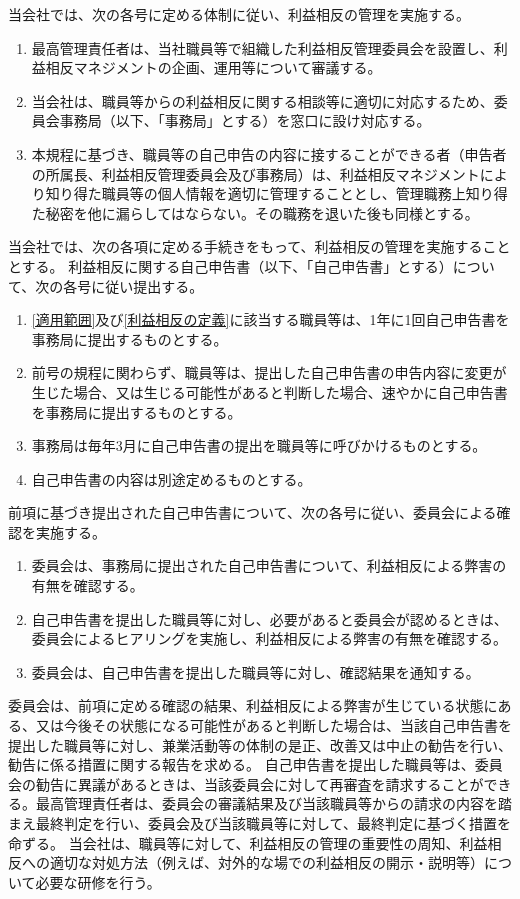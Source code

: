 \documentclass[10pt,a4paper,uplatex]{jsarticle}
\begin{document}
当会社では、次の各号に定める体制に従い、利益相反の管理を実施する。
\begin{enumerate}
	\item 最高管理責任者は、当社職員等で組織した利益相反管理委員会を設置し、利益相反マネジメントの企画、運用等について審議する。
	\item 当会社は、職員等からの利益相反に関する相談等に適切に対応するため、委員会事務局（以下、「事務局」とする）を窓口に設け対応する。
	\item 本規程に基づき、職員等の自己申告の内容に接することができる者（申告者の所属長、利益相反管理委員会及び事務局）は、利益相反マネジメントにより知り得た職員等の個人情報を適切に管理することとし、管理職務上知り得た秘密を他に漏らしてはならない。その職務を退いた後も同様とする。
\end{enumerate}

当会社では、次の各項に定める手続きをもって、利益相反の管理を実施することとする。
\term 利益相反に関する自己申告書（以下、「自己申告書」とする）について、次の各号に従い提出する。
\begin{enumerate}
	 \item \ref{適用範囲}及び\ref{利益相反の定義}に該当する職員等は、1年に1回自己申告書を事務局に提出するものとする。
	 \item  前号の規程に関わらず、職員等は、提出した自己申告書の申告内容に変更が生じた場合、又は生じる可能性があると判断した場合、速やかに自己申告書を事務局に提出するものとする。
	 \item 事務局は毎年3月に自己申告書の提出を職員等に呼びかけるものとする。
	 \item 自己申告書の内容は別途定めるものとする。
\end{enumerate}

\term 前項に基づき提出された自己申告書について、次の各号に従い、委員会による確認を実施する。
\begin{enumerate}
	\item 委員会は、事務局に提出された自己申告書について、利益相反による弊害の有無を確認する。
	\item 自己申告書を提出した職員等に対し、必要があると委員会が認めるときは、委員会によるヒアリングを実施し、利益相反による弊害の有無を確認する。
	\item 委員会は、自己申告書を提出した職員等に対し、確認結果を通知する。
\end{enumerate}

\term 委員会は、前項に定める確認の結果、利益相反による弊害が生じている状態にある、又は今後その状態になる可能性があると判断した場合は、当該自己申告書を提出した職員等に対し、兼業活動等の体制の是正、改善又は中止の勧告を行い、勧告に係る措置に関する報告を求める。
\term 自己申告書を提出した職員等は、委員会の勧告に異議があるときは、当該委員会に対して再審査を請求することができる。最高管理責任者は、委員会の審議結果及び当該職員等からの請求の内容を踏まえ最終判定を行い、委員会及び当該職員等に対して、最終判定に基づく措置を命ずる。
\term 当会社は、職員等に対して、利益相反の管理の重要性の周知、利益相反への適切な対処方法（例えば、対外的な場での利益相反の開示・説明等）について必要な研修を行う。
\end{document}
